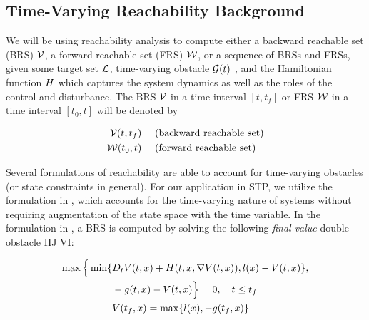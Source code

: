 \subsection{Time-Varying Reachability Background \label{sec:HJIVI}}
We will be using reachability analysis to compute either a backward reachable set (BRS) $\mathcal{V}$, a forward reachable set (FRS) $\mathcal{W}$, or a sequence of BRSs and FRSs, given some target set $\mathcal{L}$, time-varying obstacle $\mathcal{G}(t)$ , and the Hamiltonian function $H$ which captures the system dynamics as well as the roles of the control and disturbance. The BRS $\mathcal{V}$ in a time interval $[t, t_f]$  or FRS $\mathcal{W}$ in a time interval $[t_0, t]$ will be denoted by

\begin{equation}
\begin{aligned}
\mathcal{V}(t, t_f) &\quad \text{ (backward reachable set)}\\
\mathcal{W}(t_0, t) &\quad \text{ (forward reachable set)}
\end{aligned}
\end{equation}

Several formulations of reachability are able to account for time-varying obstacles \cite{Bokanowski11, Fisac15} (or state constraints in general). For our application in STP, we utilize the formulation in \cite{Fisac15}, which accounts for the time-varying nature of systems without requiring augmentation of the state space with the time variable. In the formulation in \cite{Fisac15}, a BRS is computed by solving the following \textit{final value} double-obstacle HJ VI:

\begin{equation}
\label{eq:HJIVI_BRS}
\begin{aligned}
\max \Big\{ \min \{&D_t \valfunc(t, \state) + \ham(t, \state, \nabla \valfunc(t, \state)), \fc(\state) - \valfunc(t, \state) \}, \\
&-\obsfunc(t, \state) - \valfunc(t, \state) \Big\} = 0, \quad t \le t_f \\
&\valfunc(t_f, \state) = \max\{\fc(\state), -\obsfunc(t_f, \state)\}
\end{aligned}
\end{equation}

